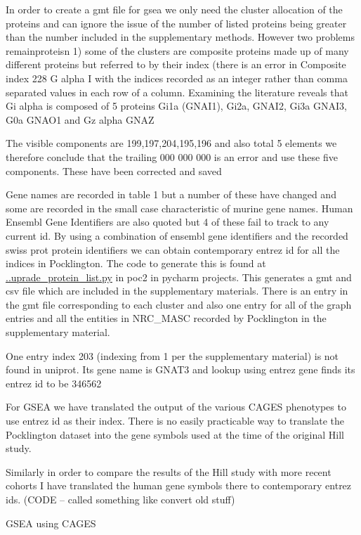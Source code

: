 In order to create a gmt file for gsea we only need the cluster allocation of the proteins and can ignore the issue of the number of listed proteins being greater than the number included in the supplementary methods. However two problems remainproteisn 1) some of the clusters are composite proteins made up of many different proteins but referred to by their index (there is an error in 
Composite index 228 G alpha I with the indices recorded as an integer rather than comma separated values in each row of a column. Examining the literature reveals that Gi alpha is composed of 5 proteins Gi1a (GNAI1), Gi2a, GNAI2, Gi3a GNAI3, G0a GNAO1 and Gz alpha GNAZ

The visible components are 199,197,204,195,196 and also total 5 elements we therefore conclude that the trailing 000 000 000 is an error and use these five components. These have been corrected and saved

Gene names are recorded in table 1 but a number of these have changed and some are recorded in the small case characteristic of murine gene names. Human Ensembl Gene Identifiers are also quoted but 4 of these fail to track to any current id.
By using a combination of ensembl gene identifiers and the recorded swiss prot protein identifiers we can obtain contemporary entrez id for all the indices in Pocklington. The code to generate this is found at \url{..uprade_protein_list.py} in poc2 in pycharm projects.
This generates a gmt and csv file which are included in the supplementary materials. There is an entry in the gmt file corresponding to each cluster and also one entry for all of the graph entries and all the entities in NRC\_MASC recorded by Pocklington in the supplementary material. 

One entry index 203 (indexing from 1 per the supplementary material) is not found in uniprot. Its gene name is GNAT3 and lookup using entrez gene finds its entrez id to be 346562

For GSEA we have translated the output of the various CAGES phenotypes to use entrez id as their index. There is no easily practicable way to translate the Pocklington dataset into the gene symbols used at the time of the original Hill study. 

Similarly in order to compare the results of the Hill study with more recent cohorts I have translated the human gene symbols there to contemporary entrez ids. (CODE – called something like convert old stuff)

GSEA using CAGES



